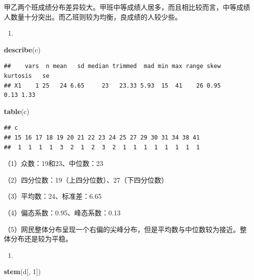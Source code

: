 \documentclass[]{ctexbook}
\newenvironment{Shaded}{\begin{snugshade}}{\end{snugshade}}
\newcommand{\DecValTok}[1]{\textcolor[rgb]{0.00,0.00,0.81}{#1}}
\newcommand{\KeywordTok}[1]{\textcolor[rgb]{0.13,0.29,0.53}{\textbf{#1}}}
\newcommand{\NormalTok}[1]{#1}
\begin{document}
甲乙两个班成绩分布差异较大。甲班中等成绩人居多，而且相比较而言，中等成绩人数量十分突出。而乙班则较为均衡，良成绩的人较少些。

\begin{enumerate}
\def\labelenumi{\arabic{enumi}.}
\setcounter{enumi}{2}
\item
\end{enumerate}

\begin{Shaded}
\begin{Highlighting}[]
\KeywordTok{describe}\NormalTok{(c)}
\end{Highlighting}
\end{Shaded}

\begin{verbatim}
##    vars  n mean   sd median trimmed  mad min max range skew kurtosis   se
## X1    1 25   24 6.65     23   23.33 5.93  15  41    26 0.95     0.13 1.33
\end{verbatim}

\begin{Shaded}
\begin{Highlighting}[]
\KeywordTok{table}\NormalTok{(c)}
\end{Highlighting}
\end{Shaded}

\begin{verbatim}
## c
## 15 16 17 18 19 20 21 22 23 24 25 27 29 30 31 34 38 41 
##  1  1  1  1  3  2  1  2  3  2  1  1  1  1  1  1  1  1
\end{verbatim}

（1）众数：19和23、中位数：23

（2）四分位数：19（上四分位数）、27（下四分位数）

（3）平均数：24、标准差：6.65

（4）偏态系数：0.95、峰态系数：0.13

（5）网民整体分布呈现一个右偏的尖峰分布，但是平均数与中位数较为接近。整体分布还是较为平稳。

\begin{enumerate}
\def\labelenumi{\arabic{enumi}.}
\setcounter{enumi}{3}
\item
\end{enumerate}

\begin{Shaded}
\begin{Highlighting}[]
\KeywordTok{stem}\NormalTok{(d[, }\DecValTok{1}\NormalTok{])}
\end{Highlighting}
\end{Shaded}
\end{document}
